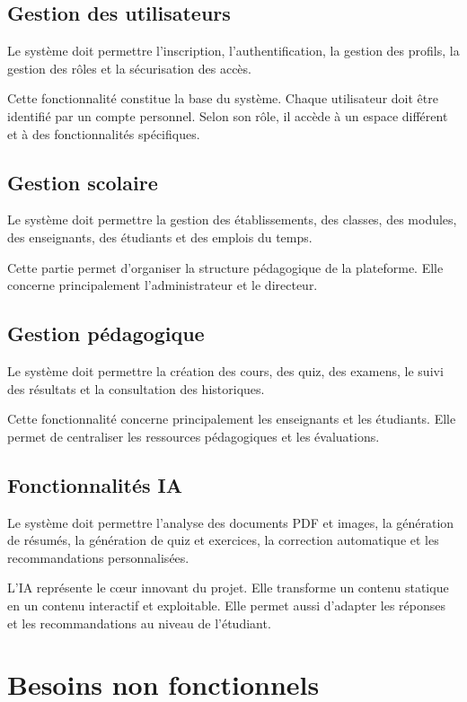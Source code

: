 \documentclass[12pt,a4paper]{report}
\begin{document}
\subsection{Gestion des utilisateurs}

Le système doit permettre l'inscription, l'authentification, la gestion des profils, la gestion des rôles et la sécurisation des accès.

Cette fonctionnalité constitue la base du système. Chaque utilisateur doit être
identifié par un compte personnel. Selon son rôle, il accède à un espace
différent et à des fonctionnalités spécifiques.

\subsection{Gestion scolaire}

Le système doit permettre la gestion des établissements, des classes, des modules, des enseignants, des étudiants et des emplois du temps.

Cette partie permet d'organiser la structure pédagogique de la plateforme. Elle
concerne principalement l'administrateur et le directeur.

\subsection{Gestion pédagogique}

Le système doit permettre la création des cours, des quiz, des examens, le suivi des résultats et la consultation des historiques.

Cette fonctionnalité concerne principalement les enseignants et les étudiants.
Elle permet de centraliser les ressources pédagogiques et les évaluations.

\subsection{Fonctionnalités IA}

Le système doit permettre l'analyse des documents PDF et images, la génération de résumés, la génération de quiz et exercices, la correction automatique et les recommandations personnalisées.

L'IA représente le cœur innovant du projet. Elle transforme un contenu statique
en un contenu interactif et exploitable. Elle permet aussi d'adapter les réponses
et les recommandations au niveau de l'étudiant.

\section{Besoins non fonctionnels}
\end{document}
